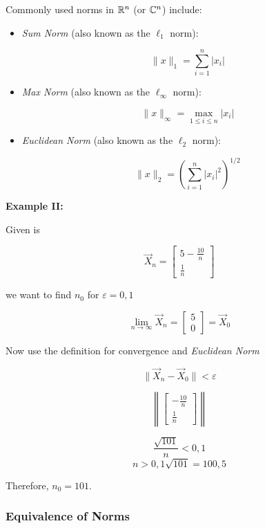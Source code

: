 Commonly used norms in \( \mathbb{R}^n \) (or \( \mathbb{C}^n \)) include:

\begin{itemize}
    
    \item \emph{Sum Norm} (also known as the \( \ell_1 \) norm): 
    
    \[
        \|x\|_1 = \sum_{i=1}^n |x_i|
    \]
    
    \item \emph{Max Norm} (also known as the \( \ell_\infty \) norm): 
    
    \[
        \|x\|_\infty = \max_{1 \leq i \leq n} |x_i|
    \]
    
    \item \emph{Euclidean Norm} (also known as the \( \ell_2 \) norm): 
    
    \[
        \|x\|_2 = \left( \sum_{i=1}^n |x_i|^2 \right)^{1/2}
    \]

\end{itemize}

\textbf{Example II:}

Given is

\[
    \vec{X}_n = 
    \begin{bmatrix}
    5 - \frac{10}{n}\\
    \frac{1}{n}   
    \end{bmatrix}
\]

we want to find \(n_0\) for \(\varepsilon = 0,1\)

\[
    \lim_{n \to \infty} \vec{X}_n = 
    \begin{bmatrix}
    5 \\
    0
    \end{bmatrix}
    = \vec{X}_0
\]

Now use the definition for convergence and \emph{Euclidean Norm}

\[
    \|\vec{X}_n - \vec{X}_0\| < \varepsilon
\]

\[
    \left\| 
    \begin{bmatrix}
        -\frac{10}{n}\\
        \frac{1}{n}
    \end{bmatrix}
    \right\|
\]

\[
    \frac{\sqrt{101}}{n} < 0,1
\]
\[
    n > 0,1 \sqrt{101} = 100,5
\]

Therefore, \(n_0 = 101\).

\subsubsection{Equivalence of Norms}

